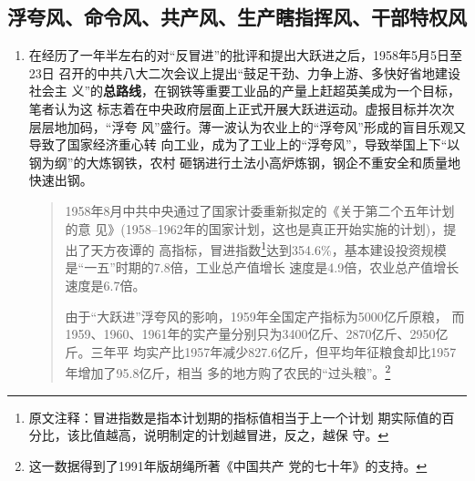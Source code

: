 
\subsection{浮夸风、命令风、共产风、生产瞎指挥风、干部特权风}

\begin{enumerate}
\item 在经历了一年半左右的对“反冒进”的批评和提出大跃进之后，1958年5月5日至23日
  召开的中共八大二次会议上提出“鼓足干劲、力争上游、多快好省地建设社会主
  义”的\textbf{总路线}，在钢铁等重要工业品的产量上赶超英美成为一个目标，笔者认为这
  标志着在中央政府层面上正式开展大跃进运动。虚报目标并次次层层地加码，“浮夸
  风”盛行。薄一波认为农业上的“浮夸风”形成的盲目乐观又导致了国家经济重心转
  向工业，成为了工业上的“浮夸风”，导致举国上下“以钢为纲”的大炼钢铁，农村
  砸锅进行土法小高炉炼钢，钢企不重安全和质量地快速出钢。

  \begin{quotation}
    1958年8月中共中央通过了国家计委重新拟定的《关于第二个五年计划的意
    见》(1958--1962年的国家计划，这也是真正开始实施的计划)，提出了天方夜谭的
    高指标，冒进指数\footnote{原文注释：冒进指数是指本计划期的指标值相当于上一个计划
      期实际值的百分比，该比值越高，说明制定的计划越冒进，反之，越保
      守。}达到354.6\%，基本建设投资规模是“一五”时期的7.8倍，工业总产值增长
    速度是4.9倍，农业总产值增长速度是6.7倍。\cite{shiyiwu}

    由于“大跃进”浮夸风的影响，1959年全国定产指标为5000亿斤原粮，
    而1959、1960、1961年的实产量分别只为3400亿斤、2870亿斤、2950亿斤。三年平
    均实产比1957年减少827.6亿斤，但平均年征粮食却比1957年增加了95.8亿斤，相当
    多的地方购了农民的“过头粮”。\footnote{这一数据得到了1991年版胡绳所著《中国共产
      党的七十年》的支持。}
  \end{quotation}



\end{enumerate}
